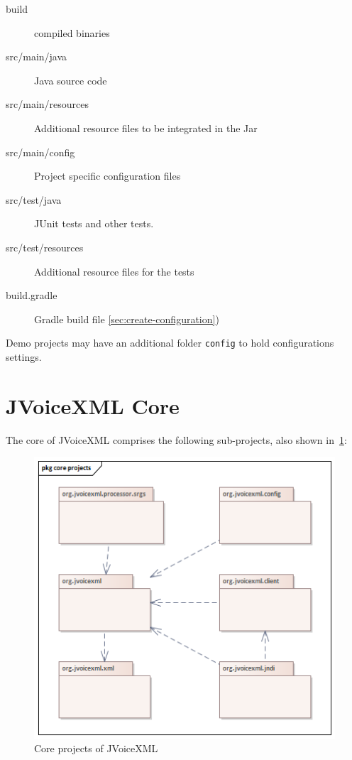 \documentclass[11pt,a4paper]{article}
\begin{document}
\begin{description}
\item[build] compiled binaries
\item[src/main/java] Java source code
\item[src/main/resources] Additional resource files to be integrated in the Jar
\item[src/main/config] Project specific configuration files
\item[src/test/java] JUnit tests and other tests.
\item[src/test/resources]  Additional resource files for the tests
\item[build.gradle] Gradle build file
\ref{sec:create-configuration})
\end{description}

Demo projects may have an additional folder \texttt{config} to hold
configurations settings. 

\section{JVoiceXML Core}
\label{sec:jvoicexml-core}

The core of JVoiceXML comprises the following sub-projects, also shown in~\ref{fig:core-projects}:
\begin{figure}
\includegraphics[width=\linewidth]{core-projects.png}
\caption{Core projects of JVoiceXML}
\label{fig:core-projects}
\end{figure}
\end{document}
